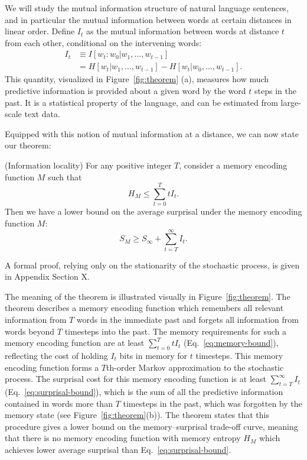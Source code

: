 We will study the mutual information structure of natural language sentences, and in particular the mutual information between words at certain distances in linear order. Define $I_t$ as the mutual information between words at distance $t$ from each other, conditional on the intervening words:
\begin{align}
    I_t &\equiv I[w_t : w_0 | w_1, \dots, w_{t-1}] \\
    &= H[w_t | w_1, \dots, w_{t-1}] - H[w_t | w_0, \dots, w_{t-1}].
\end{align}
This quantity, visualized in Figure~\ref{fig:theorem} (a), measures how much predictive information is provided about a given word by the word $t$ steps in the past.
It is a statistical property of the language, and can be estimated from large-scale text data.

Equipped with this notion of mutual information at a distance, we can now state our theorem:
\begin{thm}\label{prop:suboptimal}(Information locality) For any positive integer $T$, consider a memory encoding function $M$ such that
\begin{equation}
\label{eq:memory-bound}
H_M \le \sum_{t=0}^T t I_t.    
\end{equation}
Then we have a lower bound on the average surprisal under the memory encoding function $M$:
\begin{equation}
\label{eq:surprisal-bound}
S_M \ge S_\infty + \sum_{t=T}^\infty I_t.
\end{equation}
\end{thm}
A formal proof, relying only on the stationarity of the stochastic process, is given in Appendix Section X. 

The meaning of the theorem is illustrated visually in Figure~\ref{fig:theorem}. The theorem describes a memory encoding function which remembers all relevant information from $T$ words in the immediate past and forgets all information from words beyond $T$ timesteps into the past. The memory requirements for such a memory encoding function are at least $\sum_{t=0}^T t I_t$ (Eq.~\ref{eq:memory-bound}), reflecting the cost of holding $I_t$ bits in memory for $t$ timesteps. This memory encoding function forms a $T$th-order Markov approximation to the stochastic process. The surprisal cost for this memory encoding function is at least $\sum_{t=T}^\infty I_t$ (Eq.~\ref{eq:surprisal-bound}), which is the sum of all the predictive information contained in words more than $T$ timesteps in the past, which was forgotten by the memory state (see Figure~\ref{fig:theorem}(b)). The theorem states that this procedure gives a lower bound on the memory--surprisal trade-off curve, meaning that there is no memory encoding function with memory entropy $H_M$ which achieves lower average surprisal than Eq.~\ref{eq:surprisal-bound}.




